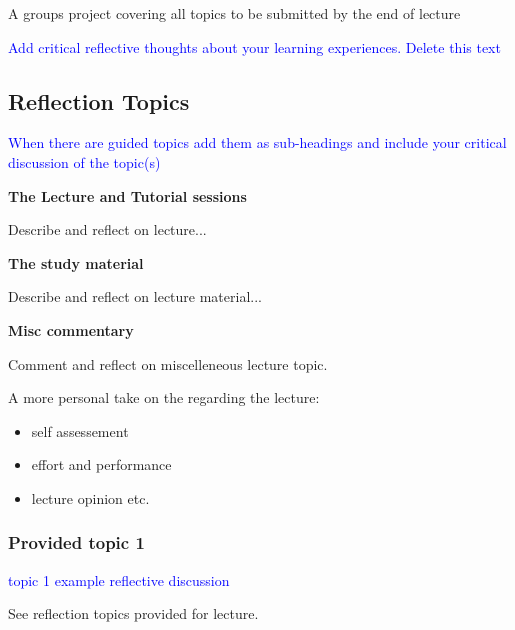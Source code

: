 {A groups project covering all topics to be submitted by the end of lecture

{\textcolor{blue}{Add critical reflective thoughts about your learning experiences. Delete this text}}



\subsection{Reflection Topics}

{\textcolor{blue}{When there are guided topics add them as sub-headings and include your critical discussion of the topic(s)}}

{\bfseries{The Lecture and Tutorial sessions}}

\begin{followup}
    Describe and reflect on lecture...
\end{followup}

{\bfseries{The study material}}


\begin{followup}
    Describe and reflect on lecture material...
\end{followup}

{\bfseries{Misc commentary}}


\begin{followup}
    Comment and reflect on miscelleneous lecture topic.

    A more personal take on the regarding the lecture:
    \begin{itemize}
        \item self assessement
        \item effort and performance
        \item lecture opinion etc.
    \end{itemize}
\end{followup}


\subsubsection{Provided topic 1}

{\textcolor{blue}{topic 1 example reflective discussion}}

\begin{followup}[]
    See reflection topics provided for lecture.


\end{followup}}
